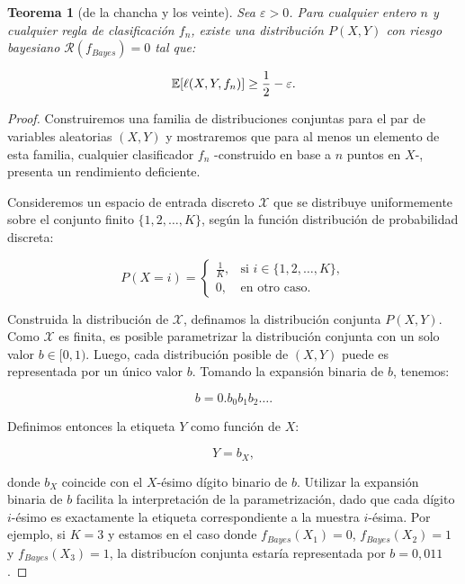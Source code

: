 \documentclass{report}
\newtheorem{thm}{Teorema}[section]
\begin{document}
\begin{thm}[de la chancha y los veinte]
Sea \(\varepsilon > 0\). Para cualquier entero \(n\) y cualquier 
regla de clasificación \(f_n\), existe una distribución \(P(X, Y)\) con riesgo bayesiano 
\(\mathcal{R}(f_{Bayes}) = 0\) tal que:

\[
\mathbb{E}[\ell(X,Y,f_n)] \geq \frac{1}{2} - \varepsilon.\newline
\]
\end{thm}

\begin{proof}

Construiremos una familia de distribuciones conjuntas para el par de variables aleatorias \((X, Y)\) y mostraremos que para al menos un 
elemento de esta familia, cualquier clasificador \(f_n\) -construido en base a $n$ puntos en $X$-, presenta un rendimiento deficiente.\newline

Consideremos un espacio de entrada 
discreto \(\mathcal{X}\) que se distribuye uniformemente sobre el conjunto finito \(\{1, 2, \dots, K\}\), 
según la función distribución de probabilidad discreta:

\[
P(X = i) = \begin{cases} 
\frac{1}{K}, & \text{si } i \in \{1, 2, \dots, K\}, \\ 
0, & \text{en otro caso}.
\end{cases}
\]


Construida la distribución de \(\mathcal{X}\), definamos la distribución conjunta \(P(X,Y)\). Como \(\mathcal{X}\) es finita,
es posible parametrizar la distribución conjunta con un solo valor
\(b \in [0,1)\). Luego, cada distribución posible de $(X,Y)$ puede es representada por un único valor \(b\).
Tomando la expansión binaria de $b$, tenemos:

\[
b = 0.b_0 b_1 b_2 \dots.
\]

Definimos entonces la etiqueta \(Y\) como función de \(X\):

\[
Y = b_X,
\]

donde \(b_X\) coincide con el \(X\)-ésimo dígito binario de \(b\). Utilizar la expansión binaria de $b$ facilita la interpretación
de la parametrización, dado que cada dígito $i$-ésimo es exactamente la etiqueta correspondiente a la muestra $i$-ésima.
Por ejemplo, si \(K=3\) y estamos en el caso donde  \(f_{Bayes}(X_1)=0\),  \(f_{Bayes}(X_2)=1\) y \(f_{Bayes}(X_3)=1\), 
la distribucíon conjunta estaría representada por $b=0,011$.\newline



\end{proof}
\end{document}
